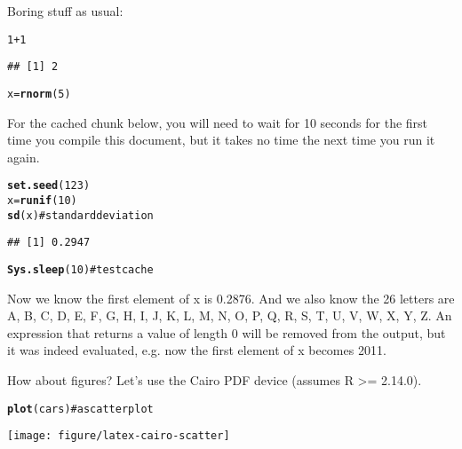 \documentclass{article}\usepackage{graphicx, color}
\makeatletter
\newcommand{\hlfunctioncall}[1]{\textcolor[rgb]{0.501960784313725,0,0.329411764705882}{\textbf{#1}}}%
\newcommand{\hlcomment}[1]{\textcolor[rgb]{0.180392156862745,0.6,0.341176470588235}{#1}}%
\newenvironment{kframe}{%
 \def\at@end@of@kframe{}%
 \ifinner\ifhmode%
  \def\at@end@of@kframe{\end{minipage}}%
  \begin{minipage}{\columnwidth}%
 \fi\fi%
 \def\FrameCommand##1{\hskip\@totalleftmargin \hskip-\fboxsep
 \colorbox{shadecolor}{##1}\hskip-\fboxsep
     \hskip-\linewidth \hskip-\@totalleftmargin \hskip\columnwidth}%
 \MakeFramed {\advance\hsize-\width
   \@totalleftmargin\z@ \linewidth\hsize
   \@setminipage}}%
 {\par\unskip\endMakeFramed%
 \at@end@of@kframe}
\newenvironment{knitrout}{}{} %
\makeatother
\begin{document}
Boring stuff as usual:

\begin{knitrout}
\color{fgcolor}\begin{kframe}
\begin{alltt}
1 + 1
\end{alltt}
\begin{verbatim}
## [1] 2
\end{verbatim}
\begin{alltt}

x = \hlfunctioncall{rnorm}(5)
\end{alltt}
\end{kframe}
\end{knitrout}


For the cached chunk below, you will need to wait for 10 seconds for
the first time you compile this document, but it takes no time the
next time you run it again.

\begin{knitrout}
\color{fgcolor}\begin{kframe}
\begin{alltt}
\hlfunctioncall{set.seed}(123)
x = \hlfunctioncall{runif}(10)
\hlfunctioncall{sd}(x)  \hlcomment{# standard deviation}
\end{alltt}
\begin{verbatim}
## [1] 0.2947
\end{verbatim}
\begin{alltt}

\hlfunctioncall{Sys.sleep}(10)  \hlcomment{# test cache}
\end{alltt}
\end{kframe}
\end{knitrout}


Now we know the first element of x is 0.2876. And we also know
the 26 letters are A, B, C, D, E, F, G, H, I, J, K, L, M, N, O, P, Q, R, S, T, U, V, W, X, Y, Z. An expression that returns a
value of length 0 will be removed from the output,  but it was indeed evaluated, e.g. now the first element
of x becomes 2011.

How about figures? Let's use the Cairo PDF device (assumes R >=
2.14.0).

\begin{knitrout}
\color{fgcolor}\begin{kframe}
\begin{alltt}
\hlfunctioncall{plot}(cars)  \hlcomment{# a scatter plot}
\end{alltt}
\end{kframe}
\texttt{[image: figure/latex-cairo-scatter]} 

\end{knitrout}
\end{document}
